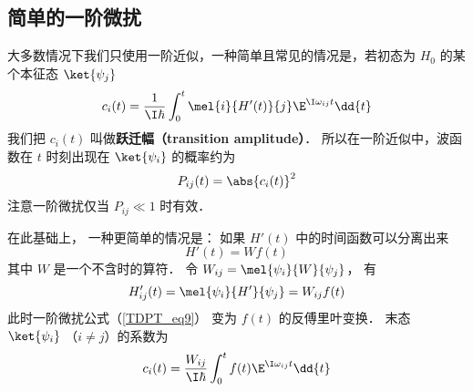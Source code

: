 \subsection{简单的一阶微扰}
大多数情况下我们只使用一阶近似，一种简单且常见的情况是，若初态为 $H_0$ 的某个本征态 $\ket{\psi_j}$
\begin{equation}
c_i(t) = \frac{1}{\I\hbar} \int_0^t \mel{i}{H'(t)}{j} \E^{\I\omega_{ij} t} \dd{t}
\end{equation}
我们把 $c_i(t)$ 叫做\textbf{跃迁幅（transition amplitude）}． 所以在一阶近似中，波函数在 $t$ 时刻出现在 $\ket{\psi_i}$ 的概率约为
\begin{equation}
P_{ij}(t) = \abs{c_i(t)}^2
\end{equation}
注意一阶微扰仅当 $P_{ij} \ll 1$ 时有效．

在此基础上， 一种更简单的情况是： 如果 $H'(t)$ 中的时间函数可以分离出来
\begin{equation}
H'(t) = W f(t)
\end{equation}
其中 $W$ 是一个不含时的算符． 令 $W_{ij} = \mel{\psi_i}{W}{\psi_j}$， 有
\begin{equation}
H'_{ij}(t) = \mel{\psi_i}{H'}{\psi_j} = W_{ij}f(t)
\end{equation}
此时一阶微扰公式（\autoref{TDPT_eq9}） 变为 $f(t)$ 的反傅里叶变换． 末态 $\ket{\psi_i}$ （$i \neq j$）的系数为
\begin{equation}
c_i(t) = \frac{W_{ij}}{\I\hbar} \int_0^t f(t)\E^{\I\omega_{ij} t} \dd{t}
\end{equation}
